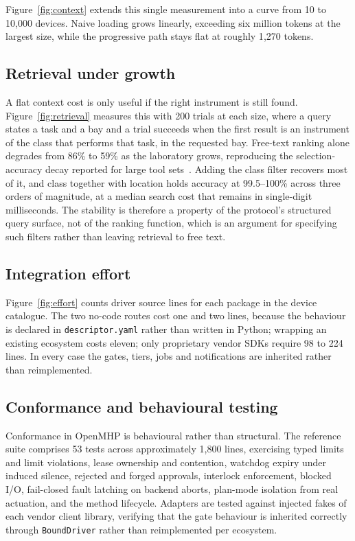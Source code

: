 \documentclass[11pt]{article}
\begin{document}



Figure~\ref{fig:context} extends this single measurement into a curve from 10 to
10{,}000 devices. Naive loading grows linearly, exceeding six million tokens at the
largest size, while the progressive path stays flat at roughly 1{,}270 tokens.

\subsection{Retrieval under growth}
A flat context cost is only useful if the right instrument is still found. Figure~\ref{fig:retrieval} measures this with 200 trials at each size, where a query states a task and a bay and a trial succeeds when the first result is an instrument of the class that performs that task, in the requested bay. Free-text ranking alone degrades from 86\% to 59\% as the laboratory grows, reproducing the selection-accuracy decay reported for large tool sets~\cite{anthropic-advanced-tool-use}. Adding the class filter recovers most of it, and class together with location holds accuracy at 99.5--100\% across three orders of magnitude, at a median search cost that remains in single-digit milliseconds. The stability is therefore a property of the protocol's structured query surface, not of the ranking function, which is an argument for specifying such filters rather than leaving retrieval to free text.

\subsection{Integration effort}
Figure~\ref{fig:effort} counts driver source lines for each package in the device catalogue. The two no-code routes cost one and two lines, because the behaviour is declared in \texttt{descriptor.yaml} rather than written in Python; wrapping an existing ecosystem costs eleven; only proprietary vendor SDKs require 98 to 224 lines. In every case the gates, tiers, jobs and notifications are inherited rather than reimplemented.


\subsection{Conformance and behavioural testing}
Conformance in OpenMHP is behavioural rather than structural. The reference suite comprises
53 tests across approximately 1{,}800 lines, exercising typed limits and limit violations,
lease ownership and contention, watchdog expiry under induced silence, rejected and forged
approvals, interlock enforcement, blocked I/O, fail-closed fault latching on backend aborts,
plan-mode isolation from real actuation, and the method lifecycle. Adapters are tested against
injected fakes of each vendor client library, verifying that the gate behaviour is inherited
correctly through \texttt{BoundDriver} rather than reimplemented per ecosystem.
\end{document}
